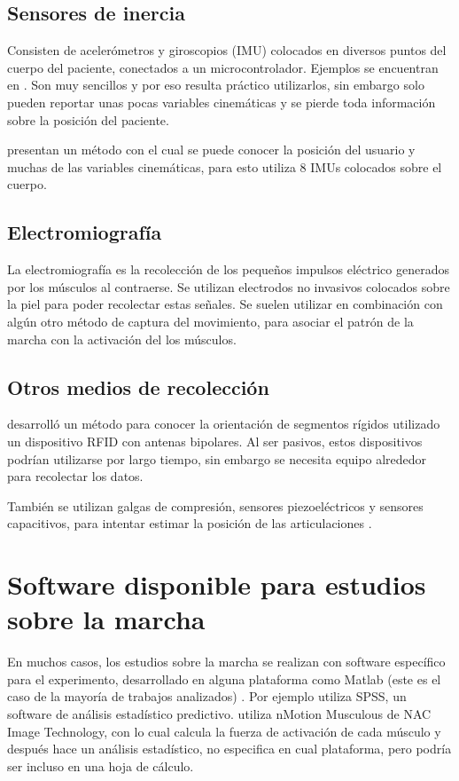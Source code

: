 \subsection{Sensores de inercia}

Consisten de acelerómetros y giroscopios (IMU) colocados en diversos puntos del cuerpo del paciente, conectados a un microcontrolador. Ejemplos se encuentran en \cite{menz, arif, senanayake, latt, mazza, hu}. Son muy sencillos y por eso resulta práctico utilizarlos, sin embargo solo pueden reportar unas pocas variables cinemáticas y se pierde toda información sobre la posición del paciente.

\cite{yuan} presentan un método con el cual se puede conocer la posición del usuario y muchas de las variables cinemáticas, para esto utiliza 8 IMUs colocados sobre el cuerpo.

\subsection{Electromiografía}

La electromiografía es la recolección de los pequeños impulsos eléctrico generados por los músculos al contraerse. Se utilizan electrodos no invasivos colocados sobre la piel para poder recolectar estas señales. Se suelen utilizar en combinación con algún otro método de captura del movimiento, para asociar el patrón de la marcha con la activación del los músculos. \citep{muro}

\subsection{Otros medios de recolección}

\cite{krigslund} desarrolló un método para conocer la orientación de segmentos rígidos utilizado un dispositivo RFID con antenas bipolares. Al ser pasivos, estos dispositivos podrían utilizarse por largo tiempo, sin embargo se necesita equipo alrededor para recolectar los datos. 

También se utilizan galgas de compresión, sensores piezoeléctricos y sensores capacitivos, para intentar estimar la posición de las articulaciones \citep{muro}.


\section[Software disponible]{Software disponible para estudios sobre la marcha}

En muchos casos, los estudios sobre la marcha se realizan con software específico para el experimento, desarrollado en alguna plataforma como Matlab (este es el caso de la mayoría de trabajos analizados) \citep{cuaya, mrozowski, eskinazi, senanayake, prakash, punt, menguc, bruijn}. Por ejemplo \cite{menz} utiliza SPSS, un software de análisis estadístico predictivo. \cite{mizoguchi} utiliza nMotion Musculous de NAC Image Technology, con lo cual calcula la fuerza de activación de cada músculo y después hace un análisis estadístico, no especifica en cual plataforma, pero podría ser incluso en una hoja de cálculo. 

